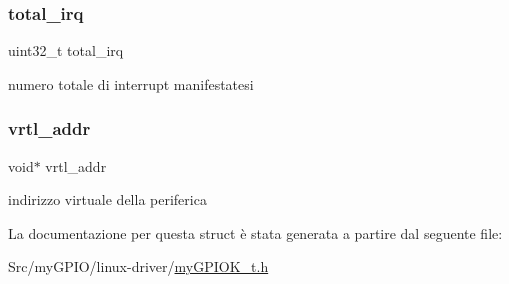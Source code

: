 \subsubsection{\texorpdfstring{total\+\_\+irq}{total\_irq}}
{\footnotesize\ttfamily uint32\+\_\+t total\+\_\+irq}

numero totale di interrupt manifestatesi \mbox{\label{structmy_g_p_i_o_k__t_af5aef493b3c2bc9d1f036ce0acea9bba}} 
\subsubsection{\texorpdfstring{vrtl\+\_\+addr}{vrtl\_addr}}
{\footnotesize\ttfamily void$\ast$ vrtl\+\_\+addr}

indirizzo virtuale della periferica 

La documentazione per questa struct è stata generata a partire dal seguente file\+:\begin{DoxyCompactItemize}
\item 
Src/my\+G\+P\+I\+O/linux-\/driver/\hyperlink{my_g_p_i_o_k__t_8h}{my\+G\+P\+I\+O\+K\+\_\+t.\+h}\end{DoxyCompactItemize}
